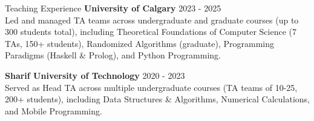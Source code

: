 \documentclass{resume} %
\begin{document}
\begin{rSection}{Teaching Experience}
\textbf{University of Calgary} \hfill 2023 - 2025 \\
Led and managed TA teams across undergraduate and graduate courses (up to 300 students total), including Theoretical Foundations of Computer Science (7 TAs, 150+ students), Randomized Algorithms (graduate), Programming Paradigms (Haskell \& Prolog), and Python Programming.


\textbf{Sharif University of Technology} \hfill 2020 - 2023 \\
Served as Head TA across multiple undergraduate courses (TA teams of 10-25, 200+ students), including Data Structures \& Algorithms, Numerical Calculations, and Mobile Programming.


\end{rSection}

\end{document}
